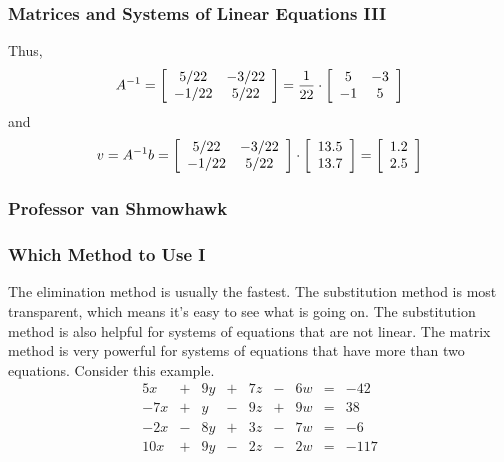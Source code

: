 \documentclass[xcolor=dvipsnames]{beamer}
\begin{document}
\begin{frame}
  \frametitle{Matrices and Systems of Linear Equations III}
Thus,
\begin{equation}
  \label{eq:oogeujie}
  A^{-1}=\left[\begin{array}{cc}
 5/22  & -3/22 \\
 -1/22 & 5/22
               \end{array}\right]=\frac{1}{22}\cdot\left[
               \begin{array}{cc}
                 5 & -3 \\
                 -1 & 5
               \end{array}\right]\notag
\end{equation}
and
\begin{equation}
  \label{eq:seeleeje}
  v=A^{-1}b=\left[\begin{array}{cc}
 5/22  & -3/22 \\
 -1/22 & 5/22
  \end{array}\right]\cdot
\left[\begin{array}{c}
 13.5   \\
 13.7  
  \end{array}\right]=\left[\begin{array}{c}
 1.2   \\
 2.5  
  \end{array}\right]\notag
\end{equation}
\end{frame}

\begin{frame}
  \frametitle{Professor van Shmowhawk}
\end{frame}

\begin{frame}
  \frametitle{Which Method to Use I}
  The elimination method is usually the fastest. The substitution
  method is most transparent, which means it's easy to see what is
  going on. The substitution method is also helpful for systems of
  equations that are not linear. The matrix method is very powerful
  for systems of equations that have more than two equations. Consider
  this example.
  \begin{equation}
    \label{eq:ohpoongo}
    \begin{array}{rcrcrcrcl}
      5x  & + & 9y & + & 7z & - & 6w & = & -42 \\
      -7x & + & y & - & 9z & + & 9w & = & 38 \\
      -2x & - & 8y & + & 3z & - & 7w & = & -6 \\
      10x & + & 9y & - & 2z & - & 2w & = & -117
    \end{array}
  \end{equation}
\end{frame}
\end{document}
